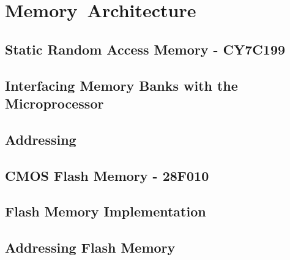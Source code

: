 \newpage
\section{Memory Architecture}

    \subsection{Static Random Access Memory - CY7C199}

    \subsection{Interfacing Memory Banks with the Microprocessor}

    \subsection{Addressing}

    \subsection{CMOS Flash Memory - 28F010}

    \subsection{Flash Memory Implementation}

    \subsection{Addressing Flash Memory}
